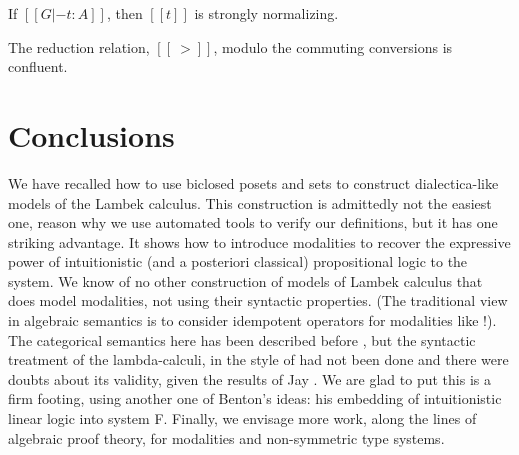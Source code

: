 \documentclass{llncs}
\begin{document}
\begin{theorem}
  \label{theorem:strong_normalization_lambdaL!k}
  If $[[G |- t : A]]$, then $[[t]]$ is strongly normalizing.
\end{theorem}

\begin{theorem}[Confluence]
  \label{thm:confluence-lambdaL!k}
  The reduction relation, $[[~>]]$, modulo the commuting conversions
  is confluent.
\end{theorem}


\section{Conclusions}
We have recalled how to use biclosed posets and sets to construct
dialectica-like models of the Lambek calculus. This construction is
admittedly not the easiest one, reason why we use automated tools to
verify our definitions, but it has one striking advantage. It shows
how to introduce modalities to recover the expressive power of
intuitionistic (and a posteriori classical) propositional logic to the
system. We know of no other construction of models of Lambek calculus
that does model modalities, not using their syntactic properties. (The
traditional view in algebraic semantics is to consider idempotent
operators for modalities like !). The categorical semantics here has
been described before \cite{depaiva1991}, but the syntactic treatment
of the lambda-calculi, in the style of \cite{benton1993} had not been
done and there were doubts about its validity, given the results of
Jay \cite{jay1991}. We are glad to put this is a firm footing, using
another one of Benton's ideas: his embedding of intuitionistic linear
logic into system F. Finally, we envisage more work, along the lines
of algebraic proof theory, for modalities and non-symmetric type
systems.



\end{document}
